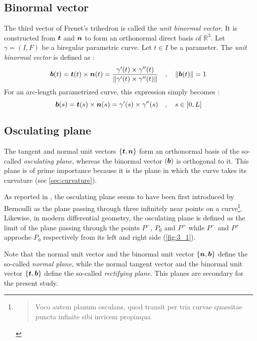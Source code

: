 \subsection{Binormal vector}
The third vector of Frenet's trihedron is called the \emph{unit binormal vector}. It is constructed from $\boldsymbol{t}$ and $\boldsymbol{n}$ to form an orthonormal direct basis of $\mathbb{R}^{3}$. 
Let $\gamma = (I,F)$ be a biregular parametric curve. Let $t \in I$ be a parameter. The \emph{unit binormal vector} is defined as :
\begin{equation}
	\boldsymbol{b}(t) = \boldsymbol{t}(t) \times \boldsymbol{n}(t)
	= \frac{\gamma'(t) \times \gamma''(t)}{\lVert\gamma'(t) \times \gamma''(t)\rVert}
	\quad,\quad
	\lVert\boldsymbol{b}(t)\rVert=1
\end{equation}
For an arc-length parametrized curve, this expression simply becomes :
\begin{equation}
	\boldsymbol{b}(s) = \boldsymbol{t}(s) \times \boldsymbol{n}(s)
	= \gamma'(s) \times \gamma''(s)
	\quad,\quad
	s \in [0,L]
\end{equation}

\subsection{Osculating plane}\label{sec:osculatingplane}
The tangent and normal unit vectors $\{\boldsymbol{t},\boldsymbol{n}\}$ form an orthonormal basis of the so-called \emph{osculating plane}, whereas the binormal vector $(\boldsymbol{b})$ is orthogonal to it. This plane is of prime importance because it is the plane in which the curve takes its curvature (see \cref{sec:curvature}).

As reported in \cite[p.45]{Delcourt2007}, the osculating plane seems to have been first introduced by Bernoulli as the plane passing through three infinitely near points on a curve\footnote{
\blockcquote[p.113]{Bernoulli1728}{Voco autem planum osculans, quod transit per tria curvae quaesitae puncta infinite sibi invicem propinqua}.
}. Likewise, in modern differential geometry, the osculating plane is defined as the limit of the plane passing through the points $P^-$, $P_0$ and $P^+$ while $P^-$ and $P^+$ approche $P_0$ respectively from its left and right side (\cref{fig:3_1}).

Note that the normal unit vector and the binormal unit vector $\{\boldsymbol{n},\boldsymbol{b}\}$ define the so-called \emph{normal plane}, while the normal tangent vector and the binormal unit vector $\{\boldsymbol{t},\boldsymbol{b}\}$ define the so-called \emph{rectifying plane}. This planes are secondary for the present study.

